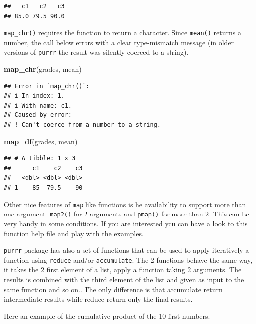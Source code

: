 \documentclass[
]{book}
\newenvironment{Shaded}{\begin{snugshade}}{\end{snugshade}}
\newcommand{\FunctionTok}[1]{\textcolor[rgb]{0.13,0.29,0.53}{\textbf{#1}}}
\newcommand{\NormalTok}[1]{#1}
\begin{document}
\begin{verbatim}
##   c1   c2   c3 
## 85.0 79.5 90.0
\end{verbatim}

\texttt{map\_chr()} requires the function to return a character. Since \texttt{mean()} returns
a number, the call below errors with a clear type-mismatch message (in older
versions of \texttt{purrr} the result was silently coerced to a string).

\begin{Shaded}
\begin{Highlighting}[]
\FunctionTok{map\_chr}\NormalTok{(grades, mean)}
\end{Highlighting}
\end{Shaded}

\begin{verbatim}
## Error in `map_chr()`:
## i In index: 1.
## i With name: c1.
## Caused by error:
## ! Can't coerce from a number to a string.
\end{verbatim}

\begin{Shaded}
\begin{Highlighting}[]
\FunctionTok{map\_df}\NormalTok{(grades, mean)}
\end{Highlighting}
\end{Shaded}

\begin{verbatim}
## # A tibble: 1 x 3
##      c1    c2    c3
##   <dbl> <dbl> <dbl>
## 1    85  79.5    90
\end{verbatim}

Other nice features of \texttt{map} like functions is he availability to support more than one argument.
\texttt{map2()} for 2 arguments and \texttt{pmap()} for more than 2. This can be very handy in some conditions.
If you are interested you can have a look to this function help file and play with the examples.

\texttt{purrr} package has also a set of functions that can be used to apply iteratively a function using \texttt{reduce} and/or \texttt{accumulate}. The 2 functions behave the same way, it takes the 2 first element of a list, apply a function taking 2 arguments. The results is combined with the third element of the list and given as input to the same function and so on.. The only difference is that accumulate return intermediate results while reduce return only the final results.

Here an example of the cumulative product of the 10 first numbers.
\end{document}
